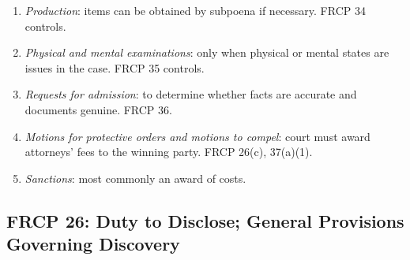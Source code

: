 \begin{enumerate}
\begin{enumerate}
        \item \emph{Production}: items can be obtained by subpoena if necessary. FRCP 34 controls.
        \item \emph{Physical and mental examinations}: only when physical or mental states are issues in the case. FRCP 35 controls.
        \item \emph{Requests for admission}: to determine whether facts are accurate and documents genuine. FRCP 36.
        \item \emph{Motions for protective orders and motions to compel}: court must award attorneys' fees to the winning party. FRCP 26(c), 37(a)(1).
        \item \emph{Sanctions}: most commonly an award of costs.
    \end{enumerate}
\end{enumerate}

\subsection{FRCP 26: Duty to Disclose; General Provisions Governing Discovery}

